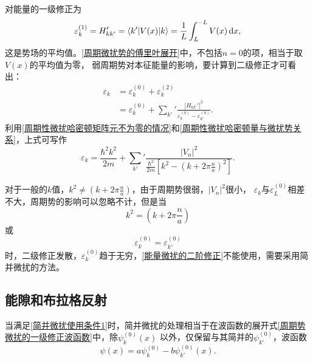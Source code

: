             对能量的一级修正为
            \begin{equation}
                \varepsilon_k^{(1)}=H'_{kk'}=\mathinner{\langle{k'|V(x)|k}\rangle}=\frac{1}{L}\int_{L}^{-L}V(x)\mathop{}\!\mathrm{d} x,
            \end{equation}
            这是势场的平均值。\autoref{周期微扰势的傅里叶展开}中，不包括$n=0$的项，相当于取$V(x)$的平均值为零，
            弱周期势对本征能量的影响，要计算到二级修正才可看出：
            \begin{equation}
                \begin{aligned}
                    \varepsilon_k&=\varepsilon_k^{(0)}+\varepsilon_k^{(2)}\\
                    &=\varepsilon_k^{(0)}+\sum_{k'}{}'\frac{\left|H_{kk'}'\right|^2}{\varepsilon_k^{(0)}-\varepsilon_{k'}^{(0)}}.                    
                \end{aligned}\label{能量微扰的二阶修正}
            \end{equation}
            利用\autoref{周期性微扰哈密顿矩阵元不为零的情况}和\autoref{周期性微扰哈密顿量与微扰势关系}，上式可写作
            \begin{equation}
                \varepsilon_k=\frac{\hbar^2k^2}{2m}+\sum_{k'}{}'\frac{\left|V_n\right|^2}{\frac{\hbar^2}{2m}\left[k^2-\left( k+2\pi\frac{n}{a} \right)^2\right]}.
            \end{equation}

            对于一般的$k$值，$k^2\neq \left( k+2\pi \frac{n}{a}\right)$，由于周期势很弱，$\left|V_n\right|^2$很小，
            $\varepsilon_k$与$\varepsilon_L^{(0)}$相差不大，周期势的影响可以忽略不计，但是当
            \begin{equation}
                k^2= \left( k+2\pi \frac{n}{a}\right)\label{简并微扰使用条件1}
            \end{equation}
            或
            \begin{equation}
                \varepsilon_k^{(0)}=\varepsilon_{k'}^{(0)}\label{简并微扰使用条件2}
            \end{equation}
            时，二级修正发散，$\varepsilon_k^{(0)}$趋于无穷，\autoref{能量微扰的二阶修正}不能使用，需要采用简并微扰的方法。
        
        \subsection{能隙和布拉格反射}
            当满足\autoref{简并微扰使用条件1}时，简并微扰的处理相当于在波函数的展开式\autoref{周期势微扰的一级修正波函数}中，除$\psi_k^{(0)}(x)$
            以外，仅保留与其简并的$\psi_{k'}^{(0)}$，波函数
            \begin{equation}
                \psi(x)=a\psi_k^{(0)}-b\psi_{k'}^{(0)}(x).
            \end{equation}
            
